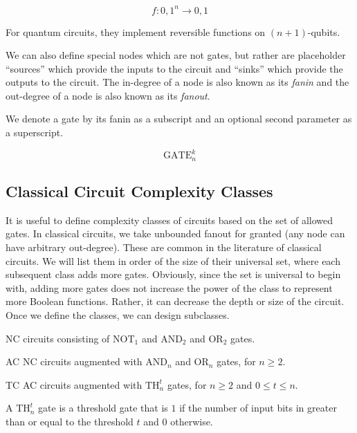 \begin{equation}
f:{0,1}^n \rightarrow {0,1}
\end{equation}

For quantum circuits, they implement reversible functions on
$(n+1)$-qubits.


 We can also define special nodes which are not gates, but rather
are placeholder ``sources'' which provide the inputs to the circuit and 
``sinks'' which provide the outputs to the circuit. The in-degree of a 
node is also known as its \emph{fanin} and the out-degree of a node is
also known as its \emph{fanout}.

We denote a gate by its fanin as a subscript and an optional
second parameter as a superscript.

\begin{equation}
\text{GATE}_n^k
\end{equation}

\subsection{Classical Circuit Complexity Classes}

It is useful to define complexity classes of circuits based on the
set of allowed gates. In classical circuits, we take unbounded fanout
for granted (any node can have arbitrary out-degree). These are common
in the literature of classical circuits. We will list them in order
of the size of their universal set, where each subsequent class adds
more gates.
Obviously, since the set is universal to begin with, adding more gates
does not increase the power of the class to represent more Boolean
functions. Rather, it can decrease the depth or size of the circuit.
Once we define the classes, we can design subclasses.

\begin{definition}
\item[\textsf{NC}]
circuits consisting of $\text{NOT}_1$ and $\text{AND}_2$ and
$\text{OR}_2$ gates.
\item[\textsf{AC}]
NC circuits augmented with $\text{AND}_n$ and $\text{OR}_n$ gates,
for $n \ge 2$.
\item[\textsf{TC}]
AC circuits augmented with $\text{TH}_n^t$ gates, for $n \ge 2$ and
$0 \le t \le n$.
\end{definition}

A $\text{TH}^t_n$ gate is a threshold gate that is $1$ if the number
of input bits in greater than or equal to the threshold $t$ and $0$
otherwise.

